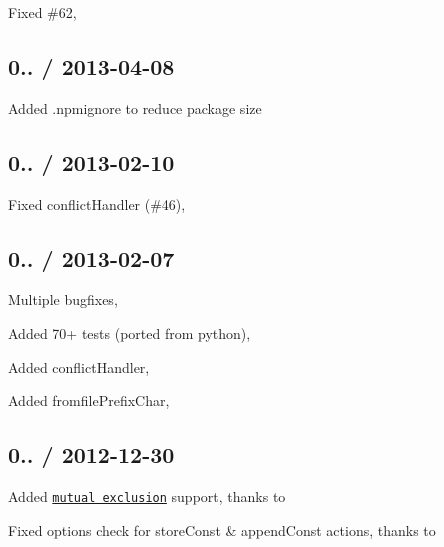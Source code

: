 \begin{DoxyItemize}
\item Fixed \#62, 
\end{DoxyItemize}

\subsection*{0.. / 2013-\/04-\/08 }


\begin{DoxyItemize}
\item Added {\ttfamily .npmignore} to reduce package size
\end{DoxyItemize}

\subsection*{0.. / 2013-\/02-\/10 }


\begin{DoxyItemize}
\item Fixed conflict\+Handler (\#46), 
\end{DoxyItemize}

\subsection*{0.. / 2013-\/02-\/07 }


\begin{DoxyItemize}
\item Multiple bugfixes, 
\item Added 70+ tests (ported from python), 
\item Added conflict\+Handler, 
\item Added fromfile\+Prefix\+Char, 
\end{DoxyItemize}

\subsection*{0.. / 2012-\/12-\/30 }


\begin{DoxyItemize}
\item Added \href{http://docs.python.org/dev/library/argparse.html#mutual-exclusion}{\tt mutual exclusion} support, thanks to 
\item Fixed options check for {\ttfamily store\+Const} \& {\ttfamily append\+Const} actions, thanks to 
\end{DoxyItemize}

